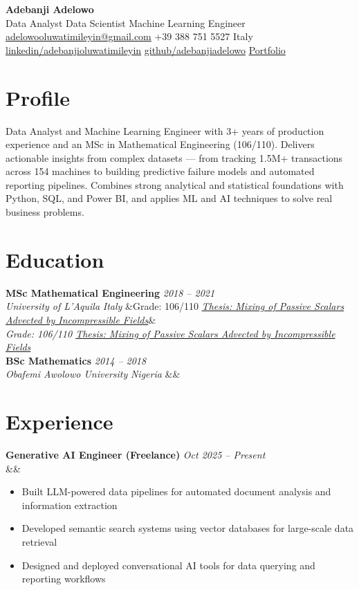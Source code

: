 \documentclass[10pt,a4paper]{article}
\newcommand{\cventry}[5]{%
  \noindent\textbf{#1} \hfill \textit{#2}\\
  \textit{#3} \hfill \textit{#4}%
  \ifx&#5&\else\\\textit{#5}\fi
  \vspace{2pt}
}
\begin{document}
\begin{center}
  {\LARGE\bfseries\color{VividPurple} Adebanji Adelowo}\\[4pt]
  {\large Data Analyst \textbar{} Data Scientist \textbar{} Machine Learning Engineer}\\[4pt]
  \small
  \href{mailto:adelowooluwatimileyin@gmail.com}{adelowooluwatimileyin@gmail.com} \quad
  +39 388 751 5527 \quad
  Italy \quad
  \href{https://linkedin.com/in/adebanjioluwatimileyin}{linkedin/adebanjioluwatimileyin} \quad
  \href{https://github.com/adebanjiadelowo}{github/adebanjiadelowo} \quad
  \href{https://adebanjioluwatimileyin.github.io/}{Portfolio}
\end{center}

\vspace{-4pt}

\section{Profile}
Data Analyst and Machine Learning Engineer with 3+ years of production experience and an MSc in Mathematical Engineering (106/110). Delivers actionable insights from complex datasets — from tracking 1.5M+ transactions across 154 machines to building predictive failure models and automated reporting pipelines. Combines strong analytical and statistical foundations with Python, SQL, and Power BI, and applies ML and AI techniques to solve real business problems.

\section{Education}

\cventry{MSc Mathematical Engineering}{2018 -- 2021}{University of L'Aquila}{Italy}{Grade: 106/110 \quad \textit{\href{https://github.com/AdebanjiAdelowo/Master-Thesis}{Thesis: Mixing of Passive Scalars Advected by Incompressible Fields}}} \\
\cventry{BSc Mathematics}{2014 -- 2018}{Obafemi Awolowo University}{Nigeria}{}

\section{Experience}

\cventry{Generative AI Engineer (Freelance)}{Oct 2025 -- Present}{}{}{}
\begin{itemize}
  \item Built LLM-powered data pipelines for automated document analysis and information extraction
  \item Developed semantic search systems using vector databases for large-scale data retrieval
  \item Designed and deployed conversational AI tools for data querying and reporting workflows
\end{itemize}
\end{document}
